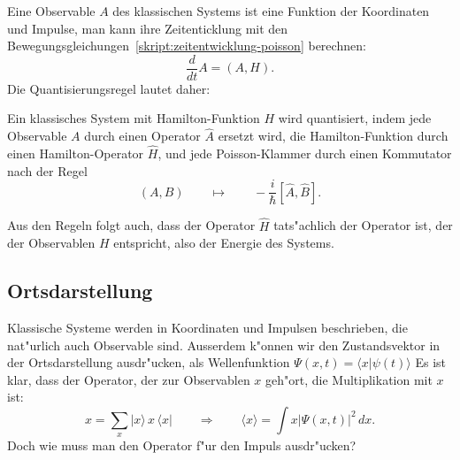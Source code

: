Eine Observable $A$ des klassischen Systems ist eine Funktion der
Koordinaten und Impulse, man kann ihre Zeitenticklung mit den
Bewegungsgleichungen~\ref{skript:zeitentwicklung-poisson}
berechnen:
\[
\frac{d}{dt}A=(A,H).
\]
Die Quantisierungsregel lautet daher:

\begin{satz}
\label{skript:quantisierung-poisson}
Ein klassisches System mit Hamilton-Funktion $H$ wird quantisiert, indem
jede Observable $A$ durch einen Operator $\hat A$ ersetzt wird, die
Hamilton-Funktion durch einen Hamilton-Operator $\hat H$, und jede
Poisson-Klammer durch einen Kommutator nach der Regel
\begin{equation}
(A,B)
\qquad
\mapsto
\qquad
-\frac{i}{\hbar}[\hat A,\hat B].
\label{skript:quantisierung-observable}
\end{equation}
\end{satz}
Aus den Regeln folgt auch, dass der Operator $\hat H$ tats"achlich
der Operator ist, der der Observablen $H$ entspricht, also der 
Energie des Systems.
\label{skript:hamilton-op-ist-energie}

\subsection{Ortsdarstellung}
Klassische Systeme werden in Koordinaten und Impulsen beschrieben, 
die nat"urlich auch Observable sind.
Ausserdem k"onnen wir den Zustandsvektor in der Ortsdarstellung
ausdr"ucken, als Wellenfunktion $\Psi(x,t)=\langle x|\psi(t)\rangle$
Es ist klar, dass der Operator, der zur Observablen $x$ geh"ort,
die Multiplikation mit $x$ ist:
\[
x
=
\sum_x |x\rangle\,x\,\langle x|
\qquad\Rightarrow\qquad
\langle x\rangle
=
\int x|\Psi(x,t)|^2\,dx.
\]
Doch wie muss man den Operator f"ur den Impuls ausdr"ucken?

